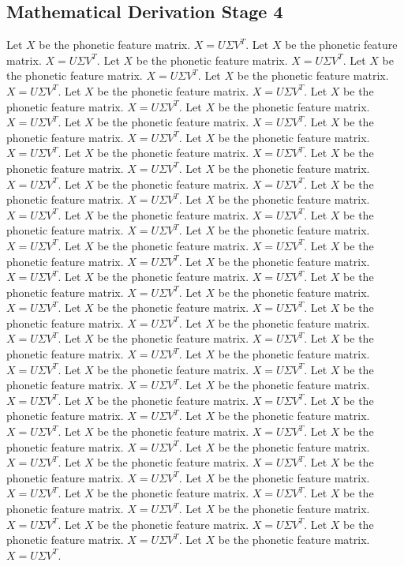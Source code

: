 \subsection{Mathematical Derivation Stage 4}
Let $X$ be the phonetic feature matrix. $X = U\Sigma V^T$. Let $X$ be the phonetic feature matrix. $X = U\Sigma V^T$. Let $X$ be the phonetic feature matrix. $X = U\Sigma V^T$. Let $X$ be the phonetic feature matrix. $X = U\Sigma V^T$. Let $X$ be the phonetic feature matrix. $X = U\Sigma V^T$. Let $X$ be the phonetic feature matrix. $X = U\Sigma V^T$. Let $X$ be the phonetic feature matrix. $X = U\Sigma V^T$. Let $X$ be the phonetic feature matrix. $X = U\Sigma V^T$. Let $X$ be the phonetic feature matrix. $X = U\Sigma V^T$. Let $X$ be the phonetic feature matrix. $X = U\Sigma V^T$. Let $X$ be the phonetic feature matrix. $X = U\Sigma V^T$. Let $X$ be the phonetic feature matrix. $X = U\Sigma V^T$. Let $X$ be the phonetic feature matrix. $X = U\Sigma V^T$. Let $X$ be the phonetic feature matrix. $X = U\Sigma V^T$. Let $X$ be the phonetic feature matrix. $X = U\Sigma V^T$. Let $X$ be the phonetic feature matrix. $X = U\Sigma V^T$. Let $X$ be the phonetic feature matrix. $X = U\Sigma V^T$. Let $X$ be the phonetic feature matrix. $X = U\Sigma V^T$. Let $X$ be the phonetic feature matrix. $X = U\Sigma V^T$. Let $X$ be the phonetic feature matrix. $X = U\Sigma V^T$. Let $X$ be the phonetic feature matrix. $X = U\Sigma V^T$. Let $X$ be the phonetic feature matrix. $X = U\Sigma V^T$. Let $X$ be the phonetic feature matrix. $X = U\Sigma V^T$. Let $X$ be the phonetic feature matrix. $X = U\Sigma V^T$. Let $X$ be the phonetic feature matrix. $X = U\Sigma V^T$. Let $X$ be the phonetic feature matrix. $X = U\Sigma V^T$. Let $X$ be the phonetic feature matrix. $X = U\Sigma V^T$. Let $X$ be the phonetic feature matrix. $X = U\Sigma V^T$. Let $X$ be the phonetic feature matrix. $X = U\Sigma V^T$. Let $X$ be the phonetic feature matrix. $X = U\Sigma V^T$. Let $X$ be the phonetic feature matrix. $X = U\Sigma V^T$. Let $X$ be the phonetic feature matrix. $X = U\Sigma V^T$. Let $X$ be the phonetic feature matrix. $X = U\Sigma V^T$. Let $X$ be the phonetic feature matrix. $X = U\Sigma V^T$. Let $X$ be the phonetic feature matrix. $X = U\Sigma V^T$. Let $X$ be the phonetic feature matrix. $X = U\Sigma V^T$. Let $X$ be the phonetic feature matrix. $X = U\Sigma V^T$. Let $X$ be the phonetic feature matrix. $X = U\Sigma V^T$. Let $X$ be the phonetic feature matrix. $X = U\Sigma V^T$. Let $X$ be the phonetic feature matrix. $X = U\Sigma V^T$. Let $X$ be the phonetic feature matrix. $X = U\Sigma V^T$. Let $X$ be the phonetic feature matrix. $X = U\Sigma V^T$. Let $X$ be the phonetic feature matrix. $X = U\Sigma V^T$. Let $X$ be the phonetic feature matrix. $X = U\Sigma V^T$. Let $X$ be the phonetic feature matrix. $X = U\Sigma V^T$. Let $X$ be the phonetic feature matrix. $X = U\Sigma V^T$. Let $X$ be the phonetic feature matrix. $X = U\Sigma V^T$. Let $X$ be the phonetic feature matrix. $X = U\Sigma V^T$. Let $X$ be the phonetic feature matrix. $X = U\Sigma V^T$. Let $X$ be the phonetic feature matrix. $X = U\Sigma V^T$. 

